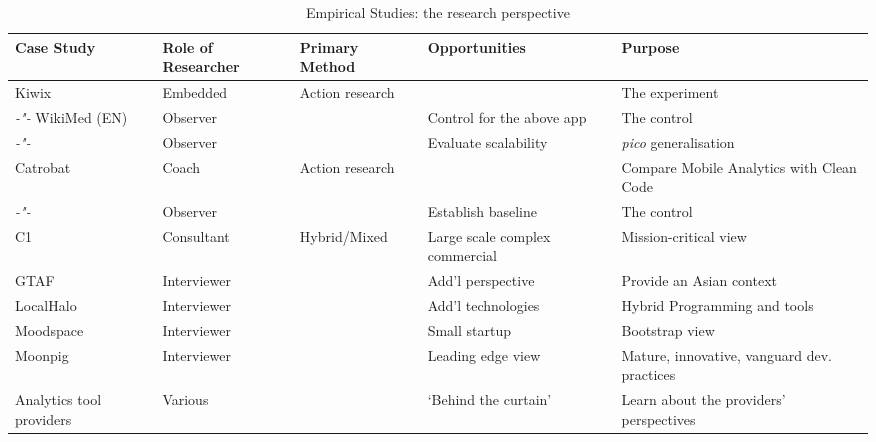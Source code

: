 \begin{table}
    \centering
    \tabcolsep=0.06cm
    \tiny
    \begin{tabular}{lllll}\toprule
    Case Study                 & Role of Researcher &  Primary Method   & Opportunities & Purpose \\
    \midrule
    Kiwix                      & Embedded           & Action research   & & The experiment \\ 
    \textit{-"-} WikiMed (EN)  & Observer           & & Control for the above app & The control  \\
    \textit{-"-}               & Observer           & & Evaluate scalability & \textit{pico} generalisation \\
    Catrobat                   & Coach              & Action research   & & Compare Mobile Analytics with Clean Code \\
     \textit{-"-}              & Observer           & & Establish baseline & The control  \\
    C1                         & Consultant         & Hybrid/Mixed & Large scale complex commercial & Mission-critical view \\
    GTAF                       & Interviewer        & & Add'l perspective & Provide an Asian context \\
    LocalHalo                  & Interviewer        & & Add'l technologies & Hybrid Programming and tools \\
    Moodspace                  & Interviewer        & & Small startup &Bootstrap view \\
    Moonpig                    & Interviewer        & & Leading edge view & Mature, innovative, vanguard dev. practices \\
    Analytics tool providers   & Various            & & `Behind the curtain' & Learn about the providers' perspectives \\
    \bottomrule
    \end{tabular}
    \caption{Empirical Studies: the research perspective}
    \label{tab:empirical-studies-research-perspective}
\end{table}


